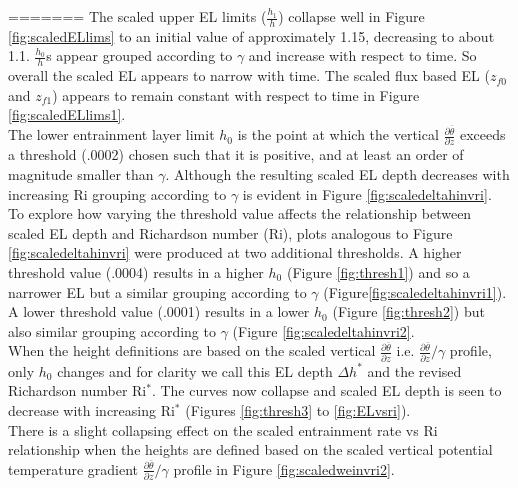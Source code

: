 =======
The scaled upper EL limits ($\frac{h_{1}}{h}$) collapse well in Figure \ref{fig:scaledELlims} 
to an initial value of approximately 1.15, decreasing to about 1.1.  $\frac{h_{0}}{h}$s appear 
grouped according to $\gamma$ and increase with respect to time.  So overall the scaled \acs{EL} appears
to narrow with time.   The scaled flux based \acs{EL} ($z_{f0}$ and $z_{f1}$) appears to remain constant 
with respect to time in Figure \ref{fig:scaledELlims1}.\\

The lower entrainment layer limit $h_{0}$ is the point at which the vertical 
$\frac{\partial \overline{\theta}}{\partial z}$ exceeds a threshold (.0002) chosen such that
it is positive, and at least an order of magnitude smaller than $\gamma$.   Although the resulting 
scaled \acs{EL} depth decreases with increasing \acs{Ri} grouping according to $\gamma$ is evident 
in Figure \ref{fig:scaledeltahinvri}.\\

To explore how varying the threshold value affects the relationship between scaled \acs{EL} depth
and Richardson number (\acs{Ri}), plots analogous to Figure \ref{fig:scaledeltahinvri} were produced at two 
additional thresholds.  A higher threshold value (.0004) results in a higher $h_{0}$ (Figure \ref{fig:thresh1})   
and so a narrower \acs{EL} but a similar grouping according to $\gamma$ (Figure\ref{fig:scaledeltahinvri1}).
A lower threshold value (.0001) results in a lower $h_{0}$ (Figure \ref{fig:thresh2})
but also similar grouping according to $\gamma$ (Figure \ref{fig:scaledeltahinvri2}.\\

When the height definitions are based on the scaled vertical $\frac{\partial \overline{\theta}}{\partial z}$
i.e. $\frac{\partial \overline{\theta}}{\partial z} / \gamma$ profile, only $h_{0}$ changes and for clarity we 
call this \acs{EL} depth $\Delta h^{*}$ and the revised Richardson number Ri$^{*}$.   The curves now collapse and 
scaled \acs{EL} depth is seen to decrease with increasing \acs{Ri}$^{*}$ (Figures \ref{fig:thresh3} to \ref{fig:ELvsri}).\\

There is a slight collapsing effect on the scaled entrainment rate vs \acs{Ri} relationship when
the heights are defined based on the scaled vertical potential temperature gradient 
$\frac{\partial \overline{\theta}}{\partial z} / \gamma$ profile in Figure \ref{fig:scaledweinvri2}.\\

